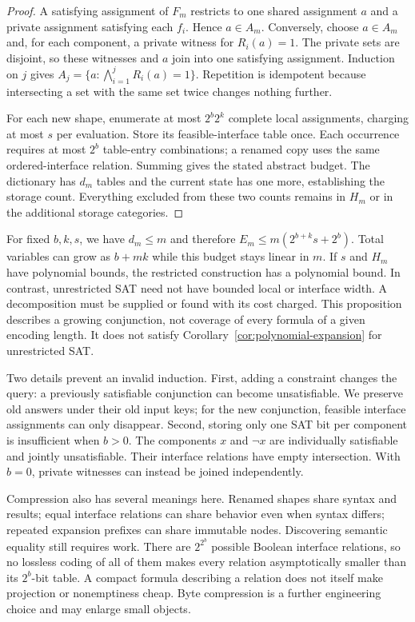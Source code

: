 \documentclass[11pt,a4paper]{article}
\numberwithin{equation}{section}
\theoremstyle{plain}
\theoremstyle{definition}
\theoremstyle{remark}
\begin{document}
\begin{proof}
A satisfying assignment of $F_m$ restricts to one shared assignment $a$ and a private assignment satisfying each $f_i$. Hence $a\in A_m$. Conversely, choose $a\in A_m$ and, for each component, a private witness for $R_i(a)=1$. The private sets are disjoint, so these witnesses and $a$ join into one satisfying assignment. Induction on $j$ gives $A_j=\{a:\bigwedge_{i=1}^j R_i(a)=1\}$. Repetition is idempotent because intersecting a set with the same set twice changes nothing further.

For each new shape, enumerate at most $2^b2^k$ complete local assignments, charging at most $s$ per evaluation. Store its feasible-interface table once. Each occurrence requires at most $2^b$ table-entry combinations; a renamed copy uses the same ordered-interface relation. Summing gives the stated abstract budget. The dictionary has $d_m$ tables and the current state has one more, establishing the storage count. Everything excluded from these two counts remains in $H_m$ or in the additional storage categories.
\end{proof}

For fixed $b,k,s$, we have $d_m\leq m$ and therefore
$E_m\leq m(2^{b+k}s+2^b)$. Total variables can grow as $b+mk$ while this budget stays linear in $m$. If $s$ and $H_m$ have polynomial bounds, the restricted construction has a polynomial bound. In contrast, unrestricted SAT need not have bounded local or interface width. A decomposition must be supplied or found with its cost charged. This proposition describes a growing conjunction, not coverage of every formula of a given encoding length. It does not satisfy Corollary~\ref{cor:polynomial-expansion} for unrestricted SAT.

Two details prevent an invalid induction. First, adding a constraint changes the query: a previously satisfiable conjunction can become unsatisfiable. We preserve old answers under their old input keys; for the new conjunction, feasible interface assignments can only disappear. Second, storing only one SAT bit per component is insufficient when $b>0$. The components $x$ and $\neg x$ are individually satisfiable and jointly unsatisfiable. Their interface relations have empty intersection. With $b=0$, private witnesses can instead be joined independently.

Compression also has several meanings here. Renamed shapes share syntax and results; equal interface relations can share behavior even when syntax differs; repeated expansion prefixes can share immutable nodes. Discovering semantic equality still requires work. There are $2^{2^b}$ possible Boolean interface relations, so no lossless coding of all of them makes every relation asymptotically smaller than its $2^b$-bit table. A compact formula describing a relation does not itself make projection or nonemptiness cheap. Byte compression is a further engineering choice and may enlarge small objects.
\end{document}
